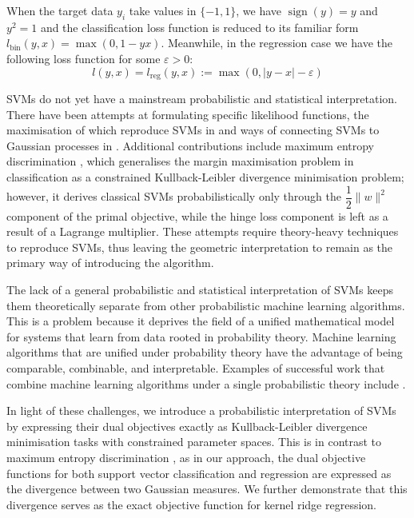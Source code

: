 \documentclass{article}
\begin{document}
When the target data $y_i$ take values in $\{- 1 , 1\}$, we have $\operatorname{sign}(y) = y$ and $y^2 = 1$ and the classification loss function is reduced to its familiar form $l_{\text{bin}} (y , x) = \max(0, 1 - y x)$. Meanwhile, in the regression case we have the following loss function for some $\varepsilon > 0$:
\begin{equation}\label{svm-regression}
l(y, x) = l_{\text{reg}}(y, x) := \max(0, \lvert y - x \rvert - \varepsilon)
\end{equation}

SVMs do not yet have a mainstream probabilistic and statistical interpretation. There have been attempts at formulating specific likelihood functions, the maximisation of which reproduce SVMs in \cite{ProbabilisticSVM} and ways of connecting SVMs to Gaussian processes in \cite{NIPS1999_a941493e}. Additional contributions include maximum entropy discrimination \cite{3009657.3009724}, which generalises the margin maximisation problem in classification as a constrained Kullback-Leibler divergence minimisation problem; however, it derives classical SVMs probabilistically only through the $\dfrac{1}{2} \|w\|^2$ component of the primal objective, while the hinge loss component is left as a result of a Lagrange multiplier. These attempts require theory-heavy techniques to reproduce SVMs, thus leaving the geometric interpretation to remain as the primary way of introducing the algorithm.

The lack of a general probabilistic and statistical interpretation of SVMs keeps them theoretically separate from other probabilistic machine learning algorithms. This is a problem because it deprives the field of a unified mathematical model for systems that learn from data rooted in probability theory. Machine learning algorithms that are unified under probability theory have the advantage of being comparable, combinable, and interpretable. Examples of successful work that combine machine learning algorithms under a single probabilistic theory include \cite{ICon}.

In light of these challenges, we introduce a probabilistic interpretation of SVMs by expressing their dual objectives exactly as Kullback-Leibler divergence minimisation tasks with constrained parameter spaces. This is in contrast to maximum entropy discrimination \cite{3009657.3009724}, as in our approach, the dual objective functions for both support vector classification and regression are expressed as the divergence between two Gaussian measures. We further demonstrate that this divergence serves as the exact objective function for kernel ridge regression.
\end{document}
